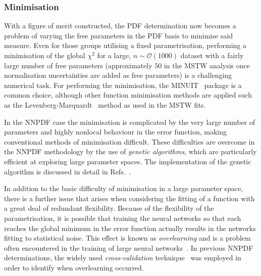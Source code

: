 \subsubsection{Minimisation}
With a figure of merit constructed, the PDF determination now becomes a problem of varying the free parameters in the PDF basis to minimise said measure. Even for those groups utilising a fixed parametrisation, performing a minimisation of the global $\chi^2$ for a large, $n\sim\mathcal{O}(1000)$ dataset with a fairly large number of free parameters (approximately $50$ in the MSTW analysis once normalisation uncertainties are added as free parameters) is a challenging numerical task. For performing the minimisation, the MINUIT~\cite{MINUIT} package is a common choice, although other function minimisation methods are applied such as the Levenberg-Marquardt~\cite{levenberg,marquardt} method as used in the MSTW fits.

In the NNPDF case the minimisation is complicated by the very large number of parameters and highly nonlocal behaviour in the error function, making conventional methods of minimisation difficult. These difficulties are overcome in the NNPDF methodology by the use of \emph{genetic algorithms}, which are particularly efficient at exploring large parameter spaces. The implementation of the genetic algorithm is discussed in detail in Refs.~\cite{Ball:2010de,DelDebbio:2007ee}.

In addition to the basic difficulty of minimisation in a large parameter space, there is a further issue that arises when considering the fitting of a function with a great deal of redundant flexibility. Because of the flexibility of the parametrisation, it is possible that training the neural networks so that each reaches the global minimum in the error function actually results in the networks fitting to statistical noise. This effect is known as \emph{overlearning} and is a problem often encountered in the training of large neural networks~\cite{bishopnn,nnoverlearn}. In previous NNPDF determinations, the widely used \emph{cross-validation} technique~\cite{Ball:2010de,bishopnn} was employed in order to identify when overlearning occurred. 

